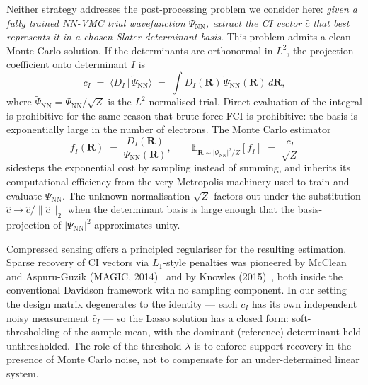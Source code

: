 \documentclass[journal=jctcce,manuscript=article,layout=traditional]{achemso}
\begin{document}
Neither strategy addresses the post-processing problem we consider
here: \emph{given a fully trained NN-VMC trial wavefunction
$\Psi_{\mathrm{NN}}$, extract the CI vector $\widehat{c}$ that best
represents it in a chosen Slater-determinant basis}. This problem
admits a clean Monte Carlo solution. If the determinants are
orthonormal in $L^2$, the projection coefficient onto
determinant $I$ is
\begin{equation}
c_I \;=\; \langle D_I \,|\, \widetilde{\Psi}_{\mathrm{NN}} \rangle
  \;=\; \int \! D_I(\mathbf{R})\, \widetilde{\Psi}_{\mathrm{NN}}(\mathbf{R})\, d\mathbf{R},
\label{eq:c_I_def}
\end{equation}
where $\widetilde{\Psi}_{\mathrm{NN}} = \Psi_{\mathrm{NN}} / \sqrt{Z}$
is the $L^2$-normalised trial. Direct evaluation of the integral is
prohibitive for the same reason that brute-force FCI is prohibitive:
the basis is exponentially large in the number of electrons. The
Monte Carlo estimator
\begin{equation}
f_I(\mathbf{R}) \;=\; \frac{D_I(\mathbf{R})}{\Psi_{\mathrm{NN}}(\mathbf{R})},
\qquad
\mathbb{E}_{\mathbf{R} \sim |\Psi_{\mathrm{NN}}|^2 / Z}\!\left[ f_I \right]
  \;=\; \frac{c_I}{\sqrt{Z}}
\label{eq:f_I_intro}
\end{equation}
sidesteps the exponential cost by sampling instead of summing, and
inherits its computational efficiency from the very Metropolis machinery
used to train and evaluate $\Psi_{\mathrm{NN}}$. The unknown
normalisation $\sqrt{Z}$ factors out under the substitution
$\widehat{c} \to \widehat{c} / \|\widehat{c}\|_2$ when the determinant
basis is large enough that the basis-projection of
$|\Psi_{\mathrm{NN}}|^2$ approximates unity.

Compressed sensing offers a principled regulariser for the resulting
estimation. Sparse recovery of CI vectors via $L_1$-style penalties was
pioneered by McClean and Aspuru-Guzik (MAGIC,
2014)~\cite{McClean2015MAGIC} and by Knowles
(2015)~\cite{Knowles2015compressive}, both inside the conventional
Davidson framework with no sampling component. In our setting the
design matrix degenerates to the identity --- each $c_I$ has its own
independent noisy measurement $\widehat{c}_I$ --- so the Lasso solution
has a closed form: soft-thresholding of the sample mean, with the
dominant (reference) determinant held unthresholded. The role of the
threshold $\lambda$ is to enforce support recovery in the presence of
Monte Carlo noise, not to compensate for an under-determined linear
system.
\end{document}
